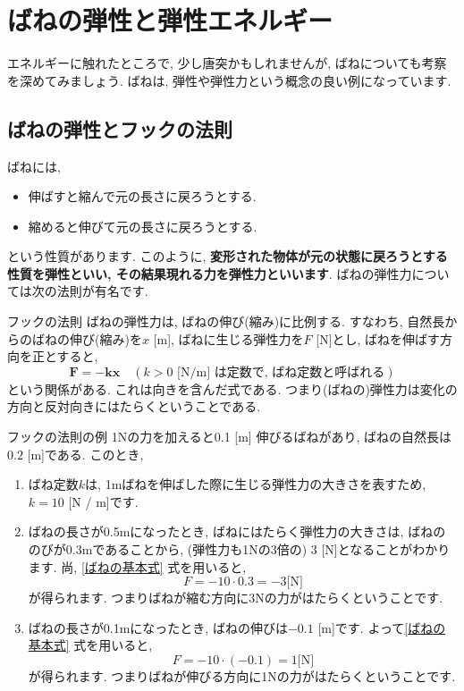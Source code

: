\documentclass[11pt,dvipdfmx]{jsarticle}
\numberwithin{equation}{section} %
\begin{document}
\section{ばねの弾性と弾性エネルギー}
エネルギーに触れたところで, 少し唐突かもしれませんが, ばねについても考察を深めてみましょう. ばねは, 弾性や弾性力という概念の良い例になっています. 
\subsection{ばねの弾性とフックの法則}
ばねには, 
\begin{itemize}
    \item 伸ばすと縮んで元の長さに戻ろうとする.
    \item 縮めると伸びて元の長さに戻ろうとする.
\end{itemize}
という性質があります. このように, \textbf{変形された物体が元の状態に戻ろうとする性質を弾性といい, その結果現れる力を弾性力といいます}. ばねの弾性力については次の法則が有名です. 
\begin{freebox}{フックの法則}
    ばねの弾性力は, ばねの伸び(縮み)に比例する. すなわち, 自然長からのばねの伸び(縮み)を$x$ [m], ばねに生じる弾性力を$F$ [N]とし, ばねを伸ばす方向を正とすると, 
    \begin{equation}
        \bm{F} = -\bm{kx}\quad (k > 0 \text{ [N/m] は定数で, ばね定数と呼ばれる}) \label{ばねの基本式}
    \end{equation}
    という関係がある. これは向きを含んだ式である. つまり(ばねの)弾性力は変化の方向と反対向きにはたらくということである. 
\end{freebox}
\begin{exbox}{フックの法則の例}
    1Nの力を加えると0.1 [m] 伸びるばねがあり, ばねの自然長は$0.2$ [m]である. このとき, 
    \begin{enumerate}
        \item ばね定数$k$は, 1mばねを伸ばした際に生じる弾性力の大きさを表すため, $k = 10$ [N / m]です. 
        \item ばねの長さが0.5mになったとき, ばねにはたらく弾性力の大きさは, ばねののびが0.3mであることから, (弾性力も1Nの3倍の) 3 [N]となることがわかります. 尚, \eqref{ばねの基本式} 式を用いると,
        \begin{equation}
            F = -10 \cdot 0.3 = -3 \text{[N]}
        \end{equation}
        が得られます. つまりばねが縮む方向に3Nの力がはたらくということです. 
        \item ばねの長さが0.1mになったとき, ばねの伸びは$-0.1$ [m]です. よって\eqref{ばねの基本式} 式を用いると, 
        \begin{equation}
            F = -10 \cdot (-0.1) = 1 \text{[N]}
        \end{equation}
        が得られます. つまりばねが伸びる方向に1Nの力がはたらくということです.
    \end{enumerate}
\end{exbox}
\end{document}
